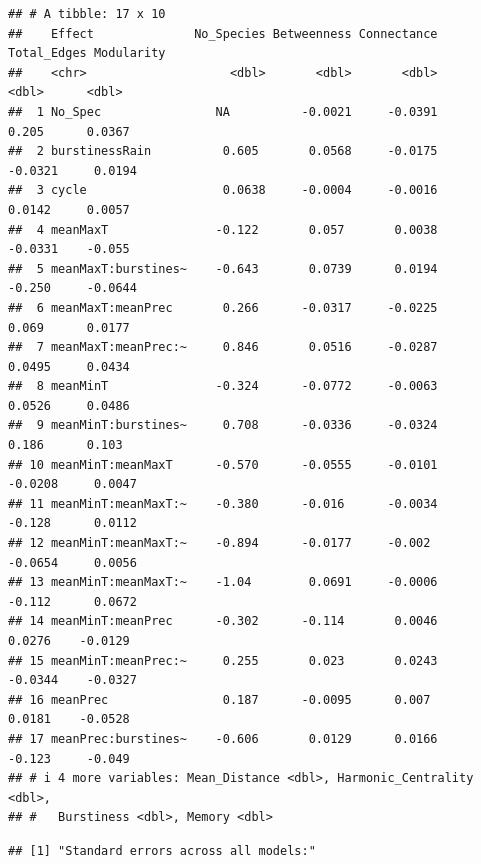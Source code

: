\documentclass[
]{article}
\begin{document}
\begin{verbatim}
## # A tibble: 17 x 10
##    Effect              No_Species Betweenness Connectance Total_Edges Modularity
##    <chr>                    <dbl>       <dbl>       <dbl>       <dbl>      <dbl>
##  1 No_Spec                NA          -0.0021     -0.0391      0.205      0.0367
##  2 burstinessRain          0.605       0.0568     -0.0175     -0.0321     0.0194
##  3 cycle                   0.0638     -0.0004     -0.0016      0.0142     0.0057
##  4 meanMaxT               -0.122       0.057       0.0038     -0.0331    -0.055 
##  5 meanMaxT:burstines~    -0.643       0.0739      0.0194     -0.250     -0.0644
##  6 meanMaxT:meanPrec       0.266      -0.0317     -0.0225      0.069      0.0177
##  7 meanMaxT:meanPrec:~     0.846       0.0516     -0.0287      0.0495     0.0434
##  8 meanMinT               -0.324      -0.0772     -0.0063      0.0526     0.0486
##  9 meanMinT:burstines~     0.708      -0.0336     -0.0324      0.186      0.103 
## 10 meanMinT:meanMaxT      -0.570      -0.0555     -0.0101     -0.0208     0.0047
## 11 meanMinT:meanMaxT:~    -0.380      -0.016      -0.0034     -0.128      0.0112
## 12 meanMinT:meanMaxT:~    -0.894      -0.0177     -0.002      -0.0654     0.0056
## 13 meanMinT:meanMaxT:~    -1.04        0.0691     -0.0006     -0.112      0.0672
## 14 meanMinT:meanPrec      -0.302      -0.114       0.0046      0.0276    -0.0129
## 15 meanMinT:meanPrec:~     0.255       0.023       0.0243     -0.0344    -0.0327
## 16 meanPrec                0.187      -0.0095      0.007       0.0181    -0.0528
## 17 meanPrec:burstines~    -0.606       0.0129      0.0166     -0.123     -0.049 
## # i 4 more variables: Mean_Distance <dbl>, Harmonic_Centrality <dbl>,
## #   Burstiness <dbl>, Memory <dbl>
\end{verbatim}

\begin{verbatim}
## [1] "Standard errors across all models:"
\end{verbatim}
\end{document}
